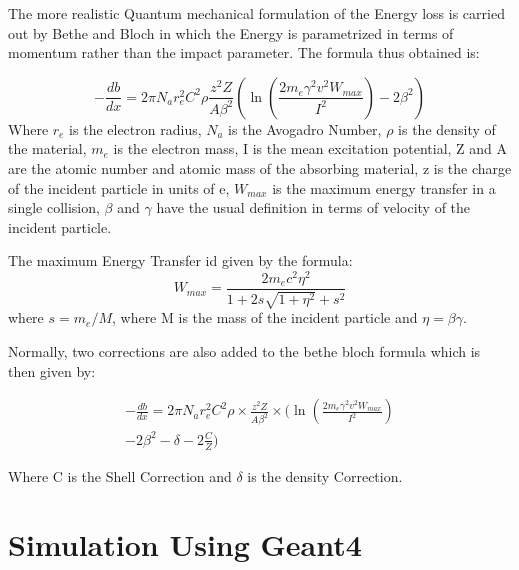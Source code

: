 \documentclass{article}
\begin{document}
\begin{multicols}{2}
The more realistic Quantum mechanical formulation of the Energy loss is carried out by
Bethe and Bloch in which the Energy is parametrized in terms of momentum rather than
the impact parameter. The formula thus obtained is:

\begin{equation}
    -\frac{db}{dx} = 2 \pi N_a r_e^2 C^2 \rho \frac{z^2 Z}{A \beta^2} (\ln{(\frac{2 m_e \gamma^2 v^2 W_{max}}{I^2})}-2\beta^2)
\end{equation}
Where $r_e$ is the electron radius, $N_a$ is the Avogadro Number, $\rho$ is the density of the material,
$m_e$ is the electron mass, I is the mean excitation potential, Z and A are the atomic
number and atomic mass of the absorbing material, z is the charge of the incident particle in units of e,
$W_{max}$ is the maximum energy transfer in a single collision, $\beta$ and $\gamma$ have the usual
definition in terms of velocity of the incident particle.

The maximum Energy Transfer id given by the formula:
\begin{equation}
    W_{max} = \frac{2m_e c^2 \eta^2}{1+2s\sqrt{1+\eta^2}+s^2}
\end{equation}
where $s=m_e/M$, where M is the mass of the incident particle and $\eta=\beta\gamma$.

Normally, two corrections are also added to the bethe bloch formula which is then given by:



\begin{eqnarray}
        -\frac{db}{dx} = 2 \pi N_a r_e^2 C^2 \rho \times\frac{z^2 Z}{A \beta^2} \times (\ln{(\frac{2 m_e \gamma^2 v^2 W_{max}}{I^2})} \\ -2\beta^2 - \delta - 2\frac{C}{Z})
\end{eqnarray} 


Where C is the Shell Correction and $\delta$ is the density Correction.






\section{Simulation Using Geant4}



\end{multicols}
\end{document}
